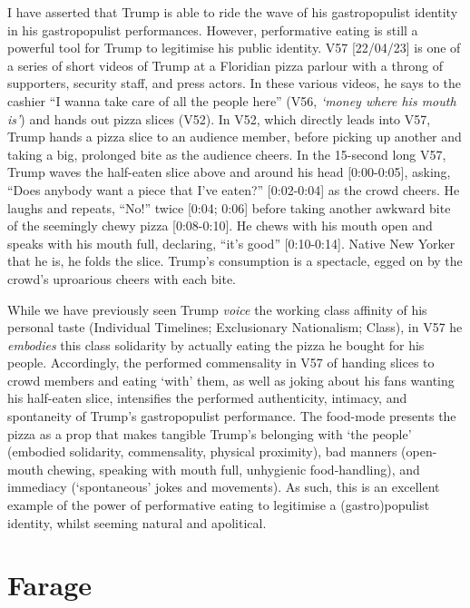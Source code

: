 \documentclass[a4paper, nobind]{templates/ociamthesis}
\begin{document}
I have asserted that Trump is able to ride the wave of his gastropopulist identity in his gastropopulist performances. However, performative eating is still a powerful tool for Trump to legitimise his public identity.
V57 {[}22/04/23{]} is one of a series of short videos of Trump at a Floridian pizza parlour with a throng of supporters, security staff, and press actors. In these various videos, he says to the cashier ``I wanna take care of all the people here'' (V56, \emph{`money where his mouth is'}) and hands out pizza slices (V52). In V52, which directly leads into V57, Trump hands a pizza slice to an audience member, before picking up another and taking a big, prolonged bite as the audience cheers. In the 15-second long V57, Trump waves the half-eaten slice above and around his head {[}0:00-0:05{]}, asking, ``Does anybody want a piece that I've eaten?'' {[}0:02-0:04{]} as the crowd cheers. He laughs and repeats, ``No!'' twice {[}0:04; 0:06{]} before taking another awkward bite of the seemingly chewy pizza {[}0:08-0:10{]}. He chews with his mouth open and speaks with his mouth full, declaring, ``it's good'' {[}0:10-0:14{]}. Native New Yorker that he is, he folds the slice. Trump's consumption is a spectacle, egged on by the crowd's uproarious cheers with each bite.

While we have previously seen Trump \emph{voice} the working class affinity of his personal taste (Individual Timelines; Exclusionary Nationalism; Class), in V57 he \emph{embodies} this class solidarity by actually eating the pizza he bought for his people. Accordingly, the performed commensality in V57 of handing slices to crowd members and eating `with' them, as well as joking about his fans wanting his half-eaten slice, intensifies the performed authenticity, intimacy, and spontaneity of Trump's gastropopulist performance. The food-mode presents the pizza as a prop that makes tangible Trump's belonging with `the people' (embodied solidarity, commensality, physical proximity), bad manners (open-mouth chewing, speaking with mouth full, unhygienic food-handling), and immediacy (`spontaneous' jokes and movements). As such, this is an excellent example of the power of performative eating to legitimise a (gastro)populist identity, whilst seeming natural and apolitical.

\hypertarget{farage-4}{%
\section*{Farage}\label{farage-4}}
\end{document}
